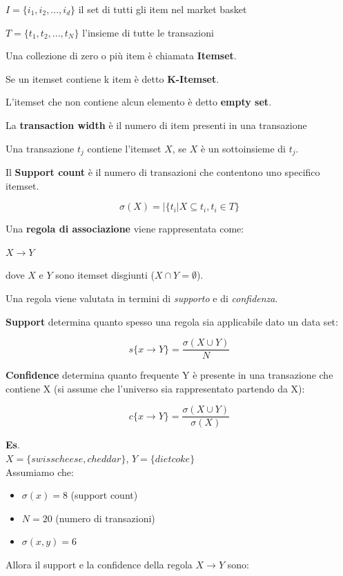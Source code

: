 $I = \{i_1, i_2,...,i_d\}$ il set di tutti gli item nel market basket

$T = \{t_1,t_2,...,t_N\}$ l'insieme di tutte le transazioni

\begin{defn}
	Una collezione di zero o più item è chiamata \textbf{Itemset}.
\end{defn} 
\begin{defn}
	Se un itemset contiene k item \`e detto \textbf{K-Itemset}.
\end{defn}
\begin{defn}
	L'itemset che non contiene alcun elemento è detto \textbf{empty set}.
\end{defn}
\begin{defn}
	La \textbf{transaction width} è il numero di item presenti in una transazione
\end{defn}
	 
Una transazione $t_j$ contiene l'itemset $X$, se $X$ è un sottoinsieme di $t_j$.

\begin{defn}
	Il \textbf{Support count} è il numero di transazioni che contentono uno specifico itemset.

\[ \sigma(X) = |\{t_i | X \subseteq t_i, t_i \in T\} \]
\end{defn}

\begin{defn}
Una \textbf{regola di associazione} viene rappresentata come:

$X \rightarrow Y$

dove $X$ e $Y$ sono itemset disgiunti ($X \cap Y = \emptyset$).
\end{defn}
Una regola viene valutata in termini di \textit{supporto} e di \textit{confidenza}.

\begin{defn}
	\textbf{Support} determina quanto spesso una regola sia applicabile dato un data set:
	
	\[s\{x \rightarrow Y\} = \frac{\sigma(X \cup Y)}{N}\]
\end{defn}
\begin{defn}
	\textbf{Confidence} determina quanto frequente Y \`e presente in una transazione che contiene X (si assume che l'universo sia rappresentato partendo da X):
	
	\[c\{x \rightarrow Y\} = \frac{\sigma(X \cup Y)}{\sigma(X)}\]
\end{defn}

\textbf{Es}. \\
$X = \{swiss cheese, cheddar\}$, $Y = \{diet coke\}$\\
Assumiamo che:
\begin{itemize}
	\item $\sigma(x) = 8$ (support count)
	\item $N = 20$ (numero di transazioni)
	\item $\sigma(x,y) = 6$ 
\end{itemize}
Allora il support e la confidence della regola $X \rightarrow Y$ sono:

